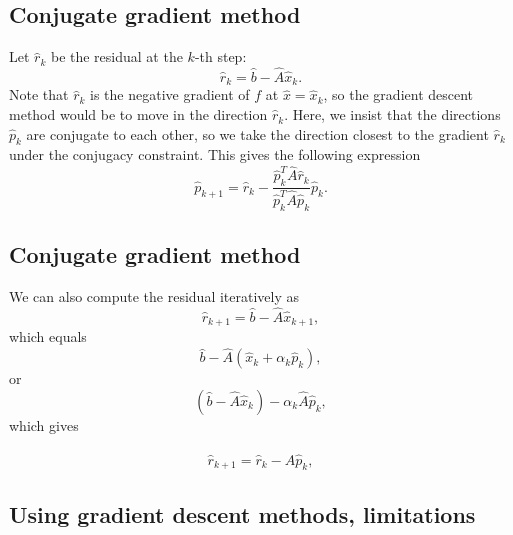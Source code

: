 \documentclass[%
oneside,                 %
final,                   %
10pt]{article}
\begin{document}
\subsection{Conjugate gradient method}
\begin{block}{}
Let  $\hat{r}_k$ be the residual at the $k$-th step:
\begin{equation*}
\hat{r}_k=\hat{b}-\hat{A}\hat{x}_k.
\end{equation*}
Note that $\hat{r}_k$ is the negative gradient of $f$ at 
$\hat{x}=\hat{x}_k$, 
so the gradient descent method would be to move in the direction $\hat{r}_k$. 
Here, we insist that the directions $\hat{p}_k$ are conjugate to each other, 
so we take the direction closest to the gradient $\hat{r}_k$  
under the conjugacy constraint. 
This gives the following expression
\begin{equation*}
\hat{p}_{k+1}=\hat{r}_k-\frac{\hat{p}_k^T \hat{A}\hat{r}_k}{\hat{p}_k^T\hat{A}\hat{p}_k} \hat{p}_k.
\end{equation*}
\end{block}

\subsection{Conjugate gradient method}
\begin{block}{}
We can also  compute the residual iteratively as
\begin{equation*}
\hat{r}_{k+1}=\hat{b}-\hat{A}\hat{x}_{k+1},
 \end{equation*}
which equals
\begin{equation*}
\hat{b}-\hat{A}(\hat{x}_k+\alpha_k\hat{p}_k),
 \end{equation*}
or
\begin{equation*}
(\hat{b}-\hat{A}\hat{x}_k)-\alpha_k\hat{A}\hat{p}_k,
 \end{equation*}
which gives

\begin{equation*}
\hat{r}_{k+1}=\hat{r}_k-\hat{A}\hat{p}_{k},
 \end{equation*}
\end{block}

\subsection{Using gradient descent methods, limitations}
\end{document}
